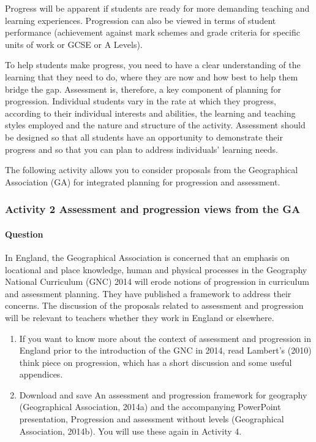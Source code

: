 \documentclass[letterpaper,10pt,english]{sphinxmanual}
\begin{document}
Progress will be apparent if students are ready for more demanding teaching and learning experiences. Progression can also be viewed in terms of student performance (achievement against mark schemes and grade criteria for specific units of work or GCSE or A Levels).

To help students make progress, you need to have a clear understanding of the learning that they need to do, where they are now and how best to help them bridge the gap. Assessment is, therefore, a key component of planning for progression. Individual students vary in the rate at which they progress, according to their individual interests and abilities, the learning and teaching styles employed and the nature and structure of the activity. Assessment should be designed so that all students have
an opportunity to demonstrate their progress and so that you can plan to address individuals’ learning needs.

The following activity allows you to consider proposals from the Geographical Association (GA) for integrated planning for progression and assessment.


\subsubsection{Activity 2 Assessment and progression \textendash{} views from the GA}
\label{\detokenize{content/session_00/Part_00_01:Activity-2-Assessment-and-progression-_-views-from-the-GA}}


\paragraph{Question}
\label{\detokenize{content/session_00/Part_00_01:id1}}
In England, the Geographical Association is concerned that an emphasis on locational and place knowledge, human and physical processes in the Geography National Curriculum (GNC) 2014 will erode notions of progression in curriculum and assessment planning. They have published a framework to address their concerns. The discussion of the proposals related to assessment and progression will be relevant to teachers whether they work in England or elsewhere.
\begin{enumerate}
%
\item {} 
If you want to know more about the context of assessment and progression in England prior to the introduction of the GNC in 2014, read Lambert’s (2010) think piece on progression, which has a short discussion and some useful appendices.

\item {} 
Download and save An assessment and progression framework for geography (Geographical Association, 2014a) and the accompanying PowerPoint presentation, Progression and assessment without levels (Geographical Association, 2014b). You will use these again in Activity 4.

\end{enumerate}
\end{document}
